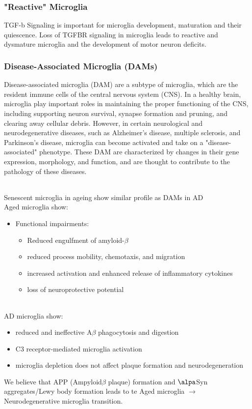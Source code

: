 \begin{itemize}
\begin{itemize}
\subsubsection{"Reactive" Microglia}
TGF-b Signaling is important for microglia
development, maturation and their
quiescence. Loss of TGFBR signaling in microglia leads to reactive and dysmature microglia and the development of motor neuron deficits.
\subsubsection{Disease-Associated Microglia (DAMs)}
Disease-associated microglia (DAM) are a subtype of microglia, which are the resident immune cells of the central nervous system (CNS). In a healthy brain, microglia play important roles in maintaining the proper functioning of the CNS, including supporting neuron survival, synapse formation and pruning, and clearing away cellular debris. However, in certain neurological and neurodegenerative diseases, such as Alzheimer's disease, multiple sclerosis, and Parkinson's disease, microglia can become activated and take on a "disease-associated" phenotype. These DAM are characterized by changes in their gene expression, morphology, and function, and are thought to contribute to the pathology of these diseases.

\\Senescent microglia in ageing show similar profile as DAMs in AD
\\Aged microglia show:
\begin{itemize}
    \item Functional impairments:
    \begin{itemize}
        \item Reduced engulfment of amyloid-$\beta$
        \item reduced process mobility, chemotaxis, and migration
        \item increased activation and enhanced release of inflammatory cytokines
        \item loss of neuroprotective potential
    \end{itemize}
\end{itemize}
\\AD microglia show:

    \begin{itemize}
        \item reduced and ineffective A$\beta$ phagocytosis and digestion
        \item C3 receptor-mediated microglia activation
        \item microglia depletion does not affect plaque formation and neurodegeneration
    \end{itemize}
We believe that APP (Ampyloid$\beta$ plaque) formation and $\alpa$Syn aggregates/Lewy body formation leads to te Aged microglia $\rightarrow$ Neurodegenerative microglia transition.


\end{itemize}
\end{itemize}
